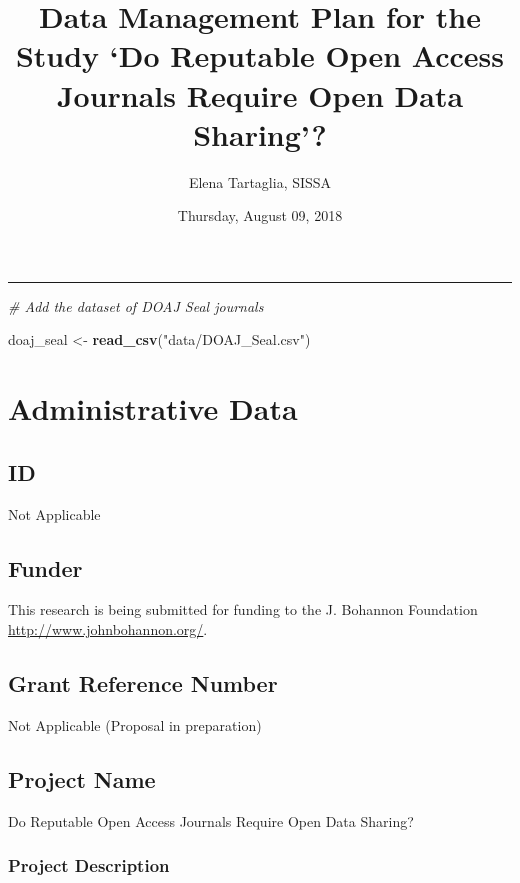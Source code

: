 \documentclass[]{article}
\title{Data Management Plan for the Study `Do Reputable Open Access Journals
Require Open Data Sharing'?}
\author{Elena Tartaglia, SISSA}
\date{Thursday, August 09, 2018}
\newenvironment{Shaded}{\begin{snugshade}}{\end{snugshade}}
\newcommand{\KeywordTok}[1]{\textcolor[rgb]{0.13,0.29,0.53}{\textbf{#1}}}
\newcommand{\StringTok}[1]{\textcolor[rgb]{0.31,0.60,0.02}{#1}}
\newcommand{\CommentTok}[1]{\textcolor[rgb]{0.56,0.35,0.01}{\textit{#1}}}
\newcommand{\NormalTok}[1]{#1}
\begin{document}
\maketitle

\begin{center}\rule{0.5\linewidth}{\linethickness}\end{center}

\begin{Shaded}
\begin{Highlighting}[]
\CommentTok{# Add the dataset of DOAJ Seal journals}

\NormalTok{doaj_seal <-}\StringTok{ }\KeywordTok{read_csv}\NormalTok{(}\StringTok{"data/DOAJ_Seal.csv"}\NormalTok{)}
\end{Highlighting}
\end{Shaded}

\section{Administrative Data}\label{administrative-data}

\subsection{ID}\label{id}

Not Applicable

\subsection{Funder}\label{funder}

This research is being submitted for funding to the J. Bohannon
Foundation \url{http://www.johnbohannon.org/}.

\subsection{Grant Reference Number}\label{grant-reference-number}

Not Applicable (Proposal in preparation)

\subsection{Project Name}\label{project-name}

Do Reputable Open Access Journals Require Open Data Sharing?

\subsubsection{Project Description}\label{project-description}
\end{document}
